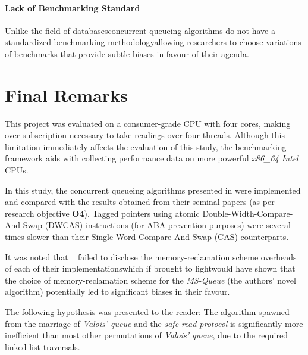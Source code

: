 \paragraph{Lack of Benchmarking Standard} Unlike the field of
databases\textemdash concurrent queueing algorithms do not have a standardized
benchmarking methodology\textemdash allowing researchers to choose variations
of benchmarks that provide subtle biases in favour of their agenda. 

\section{Final Remarks}
This project was evaluated on a consumer-grade CPU with four cores, making
over-subscription necessary to take readings over four threads. Although this
limitation immediately affects the evaluation of this study, the benchmarking
framework aids with collecting performance data on more powerful \emph{x86\_64
Intel} CPUs.

In this study, the concurrent queueing algorithms presented in
\citep{hoffman2007baskets,valois1995datastructures,michael1996simple} were
implemented and compared with the results obtained from their seminal papers
(as per research objective \textbf{O4}).
Tagged pointers using atomic Double-Width-Compare-And-Swap (DWCAS)
instructions (for ABA prevention purposes) were several times slower than
their Single-Word-Compare-And-Swap (CAS) counterparts.

It was noted that \citeauthor{michael1996simple}~\citep{michael1996simple}
failed to disclose the memory-reclamation scheme overheads of each of their
implementations\textemdash which if brought to light\textemdash would have
shown that the choice of memory-reclamation scheme for the \emph{MS-Queue} (the
authors' novel algorithm) potentially led to significant biases in their
favour.

The following hypothesis was presented to the reader: The algorithm spawned
from the marriage of \emph{Valois' queue} and the \emph{safe-read protocol} is
significantly more inefficient than most other permutations of \emph{Valois'
queue}, due to the required linked-list traversals.

